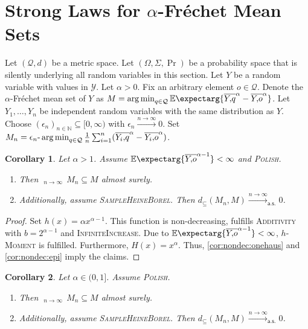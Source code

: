 \documentclass{scrartcl}
\renewcommand{\subset}{\subseteq}
\newcommand{\Ex}{\E\expectarg}
\newcommand*{\mc}[1]{\mathcal{#1}}
\newcommand*{\ms}[1]{\mathsf{#1}}
\newcommand{\N}{\mathbb{N}}
\DeclareMathOperator*{\argmin}{arg\,min}
\DeclareMathOperator*{\outerlim}{lim\, \overline{sup}}
\theoremstyle{plain}\newtheorem{theorem}{Theorem}[section]
\newtheorem{corollary}[theorem]{Corollary}
\theoremstyle{definition}
\theoremstyle{remark}
\begin{document}
 \section{Strong Laws for $\alpha$-Fréchet Mean Sets}\label{sec:power}
Let $(\mc Q, d)$ be a metric space. Let $(\Omega, \Sigma, \Pr)$ be a probability space that is silently underlying all random variables in this section. Let $Y$ be a random variable with values in $\mc Y$.
Let $\alpha > 0$. Fix an arbitrary element $o\in\mc Q$. Denote the $\alpha$-Fréchet mean set of $Y$ as $M = \argmin_{q\in\mc Q} \Ex{\ol Yq^\alpha - \ol Yo^\alpha}$.
Let $Y_1, \dots, Y_n$ be independent random variables with the same distribution as $Y$.
Choose $(\epsilon_n)_{n\in\N}\subset [0,\infty)$ with $\epsilon_n \xrightarrow{n\to\infty}0$. Set $M_n =\epsilon_n\text{-}\argmin_{q\in\mc Q} \frac1n \sum_{i=1}^n (\ol {Y_i}q^\alpha - \ol{Y_i}o^\alpha)$.
\begin{corollary}\label{cor:cons_da}
	Let $\alpha > 1$.
	Assume $\Ex{\ol Yo^{\alpha-1}} < \infty$ and \textsc{Polish}.	
	\begin{enumerate}[label=(\roman*)]
	\item Then $\outerlim_{n\to\infty}\, M_n \subset M$ almost surely.
	\item Additionally, assume \textsc{SampleHeineBorel}.
		Then $d_\subset(M_n, M) \xrightarrow{n\to\infty}_{\ms{a.s.}} 0$.
	\end{enumerate}	
\end{corollary}
\begin{proof}
	Set $h(x) = \alpha x^{\alpha-1}$. This function is non-decreasing, fulfills \textsc{Additivity} with $b = 2^{\alpha-1}$ and \textsc{InfiniteIncrease}.
	Due to $\Ex{\ol Yo^{\alpha-1}} < \infty$, \textsc{$h$-Moment} is fulfilled. Furthermore, $H(x) = x^\alpha$. Thus, \autoref{cor:nondec:onehaus} and \autoref{cor:nondec:epi} imply the claims.
\end{proof}
\begin{corollary}\label{cor:median}
	Let $\alpha \in (0,1]$. Assume \textsc{Polish}.
	\begin{enumerate}[label=(\roman*)]
	\item Then $\outerlim_{n\to\infty}\, M_n \subset M$ almost surely.
	\item Additionally, assume \textsc{SampleHeineBorel}.
		Then $d_\subset(M_n, M) \xrightarrow{n\to\infty}_{\ms{a.s.}} 0$.
	\end{enumerate}	
\end{corollary}
\end{document}

